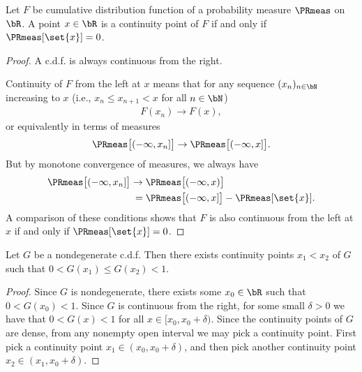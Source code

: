 \begin{lemma}
  \label{lem:cdf-continuity-pt-iff-measure-singleton}
  \leanok
  Let $F$ be cumulative distribution function of a
  probability measure $\PRmeas$ on $\bR$. A point $x \in \bR$ is
  a continuity point of $F$ if and only if $\PRmeas[\set{x}] = 0$.
\end{lemma}
\begin{proof}
  A c.d.f. is always continuous from the right.

  Continuity of $F$ from the left at $x$ means that for any
  sequence $(x_n)_{n \in \bN}$ increasing to $x$
  (i.e., $x_n \le x_{n+1} < x$ for all $n \in \bN$)
  \begin{align*}
    F(x_n) \to F(x) ,
  \end{align*}
  or equivalently in terms of measures
  \begin{align*}
    \PRmeas \big[ (-\infty,x_n] \big] \to \PRmeas \big[ (-\infty,x] \big] .
  \end{align*}
  But by monotone convergence of measures, we always have
  \begin{align*}
    \PRmeas \big[ (-\infty,x_n] \big]
    \to \; & \PRmeas \big[ (-\infty,x) \big] \\
    = \; & \PRmeas \big[ (-\infty,x] \big] - \PRmeas[\set{x}] .
  \end{align*}
  A comparison of these conditions shows that $F$ is also continuous from the left
  at $x$ if and only if $\PRmeas[\set{x}] = 0$.
\end{proof}

\begin{lemma}
  \label{lem:exists-two-nontrivial-continuity-pts-cdf}
  \leanok
  Let $G$ be a nondegenerate c.d.f. Then there exists
  continuity points $x_1 < x_2$ of $G$ such that
  $0 < G(x_1) \le G(x_2) < 1$.
\end{lemma}
\begin{proof}
  Since $G$ is nondegenerate, there exists some $x_0 \in \bR$ such that
  $0 < G(x_0) < 1$. Since $G$ is continuous from the right, for some
  small $\delta > 0$ we have that $0 < G(x) < 1$ for
  all $x \in [x_0,x_0+\delta)$. Since the continuity points of $G$
  are dense, from any nonempty open interval we may pick a continuity point.
  First pick a continuity point $x_1 \in (x_0,x_0+\delta)$,
  and then pick another continuity point $x_2 \in (x_1,x_0+\delta)$.
\end{proof}


